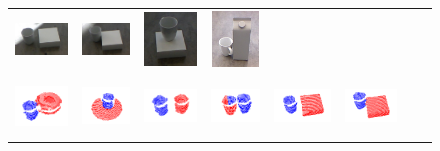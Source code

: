 \begin{figure}[h!]
\begin{tabular}{cccccccc}
    \includegraphics[height=1.5cm]{pictures/142.jpg}&
    \includegraphics[height=1.5cm]{pictures/152.jpg}&
    \includegraphics[height=1.5cm]{pictures/162.jpg}&
    \includegraphics[height=1.5cm]{pictures/172.jpg}\\ \includegraphics[height=1.5cm]{pictures/103.png}&
    \includegraphics[height=1.5cm]{pictures/113.png}&
    \includegraphics[height=1.5cm]{pictures/123.png}&
    \includegraphics[height=1.5cm]{pictures/133.png}&
    \includegraphics[height=1.5cm]{pictures/143.png}&
    \includegraphics[height=1.5cm]{pictures/153.png}&

\end{tabular}
\end{figure}

